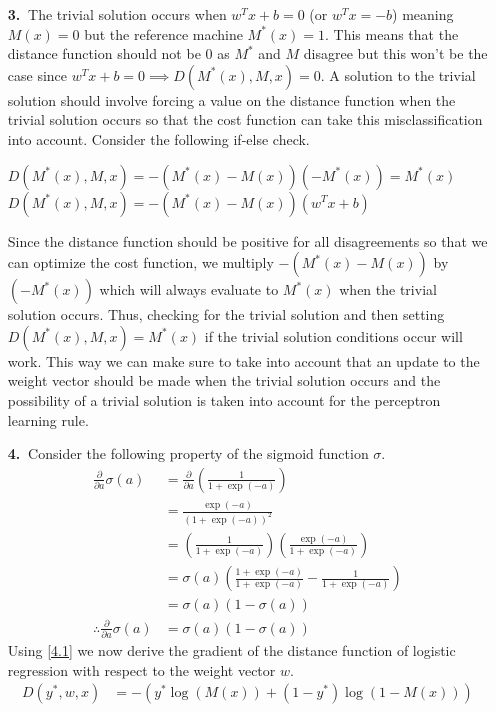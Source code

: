 \documentclass [10pt]{article}
\begin{document}
\begin{enumerate}
	\item[\textbf{3.$\>$}]The trivial solution occurs when $w^{T}x + b = 0$ (or $w^{T}x = -b$) meaning $M(x) = 0$ but the reference machine $M^{*}(x) = 1$. This means that the distance function should not be $0$ as $M^{*}$ and $M$ disagree but this won't be the case since $w^{T}x + b = 0 \implies D(M^{*}(x),M,x) = 0$. A solution to the trivial solution should involve forcing a value on the distance function when the trivial solution occurs so that the cost function can take this misclassification into account. Consider the following if-else check.
	\begin{algorithmic}
		 $D(M^{*}(x),M,x) = -(M^{*}(x)-M(x))(-M^{*}(x)) = M^{*}(x)$ \Else \: $D(M^{*}(x),M,x) = -(M^{*}(x)-M(x))(w^{T}x+b)$ \EndIf
	\end{algorithmic}
	Since the distance function should be positive for all disagreements so that we can optimize the cost function, we multiply $-(M^{*}(x)-M(x))$ by $(-M^{*}(x))$ which will always evaluate to $M^{*}(x)$ when the trivial solution occurs. Thus, checking for the trivial solution and then setting $D(M^{*}(x),M,x) = M^{*}(x)$ if the trivial solution conditions occur will work. This way we can make sure to take into account that an update to the weight vector should be made when the trivial solution occurs and the possibility of a trivial solution is taken into account for the perceptron learning rule.
	\item[\textbf{4.$\>$}]Consider the following property of the sigmoid function $\sigma$.
	\begin{align}
		\frac{\partial}{\partial a}\sigma(a) &= \frac{\partial}{\partial a}(\frac{1}{1+\exp(-a)}) \nonumber \\
		&= \frac{\exp(-a)}{(1+\exp(-a))^{2}} \nonumber \\
		&= (\frac{1}{1+\exp(-a)})(\frac{\exp(-a)}{1+\exp(-a)}) \nonumber \\
		&= \sigma(a)(\frac{1+\exp(-a)}{1+\exp(-a)}-\frac{1}{1+\exp(-a)}) \nonumber \\
		&= \sigma(a)(1-\sigma(a)) \nonumber \\
		\label{4.1} \tag{4.1} \therefore \frac{\partial}{\partial a}\sigma(a) &= \sigma(a)(1-\sigma(a))
	\end{align}
	Using \ref{4.1} we now derive the gradient of the distance function of logistic regression with respect to the weight vector $w$.
	\begin{align}
		D(y^{*},w,x) &= -(y^{*}\log(M(x))+(1-y^{*})\log(1-M(x))) \nonumber \\

\end{align}
\end{enumerate}
\end{document}
